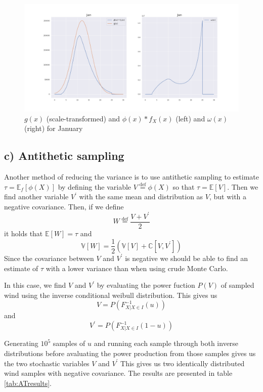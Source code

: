 \documentclass[a4paper]{article}
\begin{document}
\begin{figure}[H]
    \centering
    \includegraphics[width = 1.0\textwidth]{images/janISMC}
    \caption{$g(x)$ (scale-transformed) and $\phi(x)*f_X(x)$ (left) and $\omega(x)$ (right) for January}
    \label{fig:ISMCjan}
\end{figure}

\subsection*{c) Antithetic sampling}
Another method of reducing the variance is to use antithetic sampling to estimate $\tau = \mathbb{E}_f[\phi (X)]$ by defining the variable $V \overset{\mathrm{def}}{=} \phi (X)$ so that $\tau = \mathbb{E}[V]$. Then we find another variable $V^\prime$ with the same mean and distribution as $V$, but with a negative covariance. Then, if we define $$W \overset{\mathrm{def}}{=} \frac{V + V^\prime}{2}$$ it holds that $\mathbb{E}[W] = \tau$ and $$\mathbb{V}[W] = \frac{1}{2}(\mathbb{V}[V] + \mathbb{C}[V, V^\prime])$$Since the covariance between $V$ and $V^\prime$ is negative we should be able to find an estimate of $\tau$ with a lower variance than when using crude Monte Carlo.

In this case, we find $V$ and $V^\prime$ by evaluating the power fuction $P(V)$ of sampled wind using the inverse conditional weibull distribution. This gives us
\begin{equation}
    V = P(F_{X|X\in I}^{-1}(u))
\end{equation}
and
\begin{equation}
    V^\prime = P(F_{X|X\in I}^{-1}(1-u))
\end{equation}

Generating $10^5$ samples of $u$ and running each sample through both inverse distributions before avaluating the power production from those samples gives us the two stochastic variables $V$ and $V^\prime$ This gives us two identically distributed wind samples with negative covariance. The results are presented in table \ref{tab:ATresults}.
\end{document}
